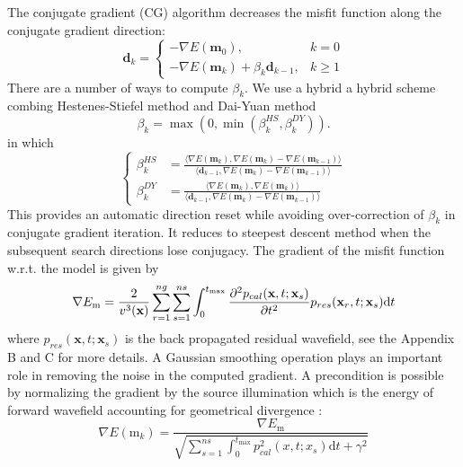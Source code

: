 The conjugate gradient (CG) algorithm decreases the misfit function along the conjugate gradient direction:
\begin{equation}
	\textbf{d}_k=
	\begin{cases}
	-\nabla E(\textbf{m}_0), & k=0\\
	-\nabla E(\textbf{m}_k)+\beta_k \textbf{d}_{k-1}, & k\geq 1
	\end{cases}
\end{equation}
There are a number of ways to compute $\beta_k$. We use a hybrid a hybrid scheme combing Hestenes-Stiefel method and Dai-Yuan method  \citep{hager2006survey}
\begin{equation}
\beta_k=\max(0, \min(\beta_k^{HS},\beta_k^{DY})).
\end{equation}
in which
\begin{equation}\label{eq:beta}
\left\{
\begin{split}
\beta_k^{HS}&=\frac{\langle\nabla E(\textbf{m}_k),\nabla E(\textbf{m}_k)-\nabla E(\textbf{m}_{k-1})\rangle}{\langle\textbf{d}_{k-1},\nabla E(\textbf{m}_k)-\nabla E(\textbf{m}_{k-1})\rangle}\\
\beta_k^{DY}&=\frac{\langle\nabla E(\textbf{m}_k),\nabla E(\textbf{m}_k)\rangle}{\langle\textbf{d}_{k-1},\nabla E(\textbf{m}_k)-\nabla E(\textbf{m}_{k-1})\rangle}
\end{split}
\right.
\end{equation}
This provides an automatic direction reset while avoiding over-correction of $\beta_k$ in conjugate gradient iteration. It reduces to steepest descent method when the subsequent search directions lose conjugacy. The gradient of the misfit function w.r.t. the model is given by \citep{bunks1995multiscale}
\begin{equation}
\nabla E_{\mathrm{m}}
=\frac{2}{v^3(\textbf{x})}\sum_{r=1}^{ng}\sum_{s=1}^{ns}\int_{0}^{t_{\max}} 
\frac{\partial^2 p_{cal}(\textbf{x},t;\textbf{x}_s)}{\partial t^2}p_{res}(\textbf{x}_r,t;\textbf{x}_s)\mathrm{d}t\\
\end{equation}
where $p_{res}(\textbf{x},t;\textbf{x}_s)$ is the back propagated residual wavefield, see the Appendix B and C for more details. A Gaussian smoothing operation plays an important role in removing the noise in the computed gradient. A precondition is possible by normalizing the gradient by the source illumination which is the energy of forward wavefield accounting for geometrical divergence \citep{gauthier1986two,bai2014viscoacoustic}:
\begin{equation}
\nabla E(\mathrm{m}_k)=\frac{\nabla E_{\mathrm{m}}}{\sqrt{\sum_{s=1}^{ns}\int_{0}^{t_{\max}} p_{cal}^2(x,t;x_s)\mathrm{d}t+\gamma^2}}
\end{equation}
